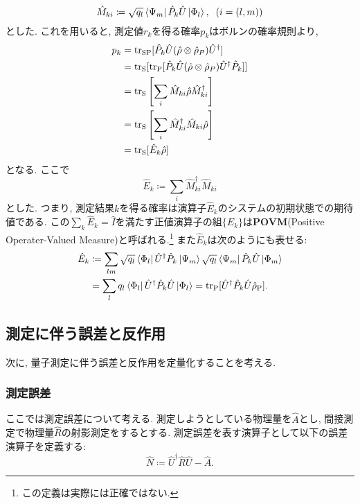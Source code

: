 \begin{equation}
  \hat{M}_{ki}\coloneqq\sqrt{q_l}\bra{\Psi_m}\hat{P}_k\hat{U}\ket{\Phi_l},\hspace{2mm}(i=(l,m))
\end{equation}
とした. これを用いると, 測定値\(r_k\)を得る確率\(p_k\)はボルンの確率規則より, 
\begin{equation}
  \begin{aligned}
    p_k&=\tr_{\si{SP}}[\hat{P}_k\hat{U}(\hat{\rho}\otimes\hat{\rho}_P)\hat{U}^\dag]\\
    &=\tr_{\si{S}}[\tr_{\si{P}}[\hat{P}_k\hat{U}(\hat{\rho}\otimes\hat{\rho}_P)\hat{U}^\dag\hat{P}_k]]\\
    &=\tr_{\si{S}}\left[\sum_{i}\hat{M}_{ki}\hat{\rho}\hat{M}_{ki}^\dag\right]\\
    &=\tr_{\si{S}}\left[\sum_{i}\hat{M}_{ki}^\dag\hat{M}_{ki}\hat{\rho}\right]\\
    &=\tr_{\si{S}}[\hat{E}_k\hat{\rho}]
    \end{aligned}
\end{equation}
となる. ここで
\begin{equation}
  \hat{E}_k\coloneqq\sum_{i}\hat{M}_{ki}^\dag\hat{M}_{ki}
\end{equation}
とした. つまり, 測定結果\(k\)を得る確率は演算子\(\hat{E}_k\)のシステムの初期状態での期待値である. この\(\sum_{k}\hat{E}_{k}=\hat{I}\)を満たす正値演算子の組\(\{\hat{E}_k\}\)は\textbf{POVM}(Positive Operater-Valued Measure)と呼ばれる.\footnote{この定義は実際には正確ではない.} また\(\hat{E}_k\)は次のようにも表せる:
\begin{equation}
  \begin{aligned}
    \hat{E}_k&\coloneqq\sum_{lm}\sqrt{q_l}\bra{\Phi_l}\hat{U}^\dag\hat{P}_k\ket{\Psi_m}\sqrt{q_l}\bra{\Psi_m}\hat{P}_k\hat{U}\ket{\Phi_m}\\
    &=\sum_{l}q_l\bra{\Phi_l}\hat{U}^\dag\hat{P}_k\hat{U}\ket{\Phi_l}=\tr_{\si{P}}[\hat{U}^\dag\hat{P}_k\hat{U}\hat{\rho}_{\si{P}}].
    \end{aligned}
\end{equation}

\subsection{測定に伴う誤差と反作用}
次に, 量子測定に伴う誤差と反作用を定量化することを考える. 
\subsubsection{測定誤差}
ここでは測定誤差について考える. 測定しようとしている物理量を\(\hat{A}\)とし, 間接測定で物理量\(\hat{R}\)の射影測定をするとする. 
 測定誤差を表す演算子として以下の誤差演算子を定義する:
\begin{equation}
  \hat{N}\coloneqq\hat{U}^\dag\hat{R}\hat{U}-\hat{A}.
\end{equation}

